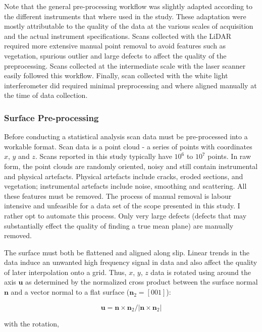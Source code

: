 \documentclass[12pt,a4paper]{article}
\begin{document}
Note that the general pre-processing workflow was slightly adapted according to the different instruments that where used in the study. These adaptation were mostly attributable to the quality of the data at the various scales of acquisition and the actual instrument specifications. Scans collected with the LiDAR required more extensive manual point removal to avoid features such as vegetation, spurious outlier and large defects to affect the quality of the preprocessing. Scans collected at the intermediate scale with the laser scanner easily followed this workflow. Finally, scan collected with the white light interferometer did required minimal preprocessing and where aligned manually at the time of data collection. 

		\subsubsection{Surface Pre-processing}

Before conducting a statistical analysis scan data must be pre-processed into a workable format. Scan data is a point cloud - a series of points with coordinates $x$, $y$ and $z$. Scans reported in this study typically have $10^6$ to $ 10^7$ points. In raw form, the point clouds are randomly oriented, noisy and still contain instrumental and physical artefacts. Physical artefacts include cracks, eroded sections, and vegetation; instrumental artefacts include noise, smoothing and scattering. All these features must be removed. The process of manual removal is labour intensive and unfeasible for a data set of the scope presented in this study. I rather opt to automate this process. Only very large defects (defects that may substantially effect the quality of finding a true mean plane) are manually removed.


The surface must both be flattened and aligned along slip. Linear trends in the data induce an unwanted high frequency signal in data and also affect the quality of later interpolation onto a grid. Thus, $x$, $y$, $z$ data is rotated using around the axis $\textbf{u}$ as determined by the normalized cross product between the surface normal $\textbf{n}$ and a vector normal to a flat surface ($\textbf{n}_2 = [0 0 1]$): 

$$ \textbf{u} = {\textbf{n}\times\textbf{n}_2}/{|{\textbf{n}\times\textbf{n}_2}|} $$

with the rotation,
\end{document}
